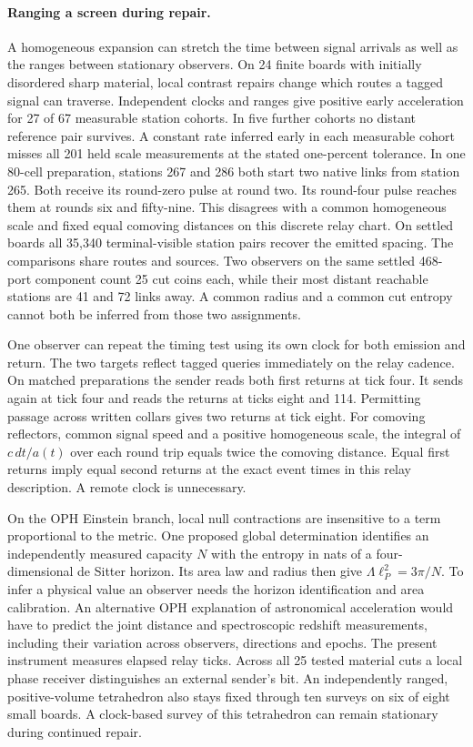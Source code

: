 \documentclass[11pt]{article}
\theoremstyle{definition}
\theoremstyle{remark}
\theoremstyle{plain}
\begin{document}
\paragraph{Ranging a screen during repair.}
A homogeneous expansion can stretch the time between signal arrivals
as well as the ranges between stationary observers. On 24 finite
boards with initially disordered sharp material, local contrast repairs
change which routes a tagged signal can traverse. Independent clocks
and ranges give positive early acceleration for 27 of 67 measurable
station cohorts. In five further cohorts no distant reference pair
survives. A constant rate inferred early in each measurable cohort
misses all 201 held scale measurements at the stated one-percent
tolerance. In one 80-cell preparation, stations 267 and 286 both
start two native links from station 265. Both receive its round-zero
pulse at round two. Its round-four pulse reaches them at rounds six
and fifty-nine. This disagrees with a common homogeneous scale and
fixed equal comoving distances on this discrete relay chart. On
settled boards all 35,340 terminal-visible station pairs recover the
emitted spacing. The comparisons share routes and sources. Two observers
on the same settled 468-port component count 25 cut coins each, while
their most distant reachable stations are 41 and 72 links away. A
common radius and a common cut entropy cannot both be inferred from
those two assignments.

One observer can repeat the timing test using its own clock for both
emission and return. The two targets reflect tagged queries immediately
on the relay cadence. On matched preparations the sender reads both
first returns at tick four. It sends again at tick four and reads the
returns at ticks eight and 114. Permitting passage across written
collars gives two returns at tick eight. For comoving reflectors,
common signal speed and a positive homogeneous scale, the integral of
$c\,dt/a(t)$ over each round trip equals twice the comoving distance.
Equal first returns imply equal second returns at the exact event
times in this relay description. A remote clock is unnecessary.

On the OPH Einstein branch, local null contractions are insensitive to
a term proportional to the metric. One proposed global determination
identifies an independently measured capacity $N$ with the entropy in
nats of a four-dimensional de Sitter horizon. Its area law and radius
then give $\Lambda\ell_P^2=3\pi/N$. To infer a physical value an
observer needs the horizon identification and area calibration. An
alternative OPH explanation of astronomical acceleration would have to
predict the joint distance and spectroscopic redshift measurements,
including their variation across observers, directions and epochs.
The present instrument measures elapsed relay ticks. Across all 25
tested material cuts a local phase receiver distinguishes an external
sender's bit. An independently ranged, positive-volume tetrahedron
also stays fixed through ten surveys on six of eight small boards.
A clock-based survey of this tetrahedron can remain stationary
during continued repair.
\end{document}
